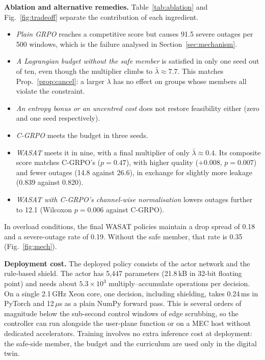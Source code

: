 \documentclass[conference]{IEEEtran}
\begin{document}
\textbf{Ablation and alternative remedies.} Table~\ref{tab:ablation} and Fig.~\ref{fig:tradeoff} separate the contribution of each ingredient.
\begin{itemize}
\item \emph{Plain GRPO} reaches a competitive score but causes 91.5 severe outages per 500 windows, which is the failure analysed in Section~\ref{sec:mechanism}.
\item \emph{A Lagrangian budget without the safe member} is satisfied in only one seed out of ten, even though the multiplier climbs to $\bar\lambda\approx7.7$. This matches Prop.~\ref{prop:cancel}: a larger $\lambda$ has no effect on groups whose members all violate the constraint.
\item \emph{An entropy bonus or an uncentred cost} does not restore feasibility either (zero and one seed respectively).
\item \emph{C-GRPO} meets the budget in three seeds.
\item \emph{WASAT} meets it in nine, with a final multiplier of only $\bar\lambda\approx0.4$. Its composite score matches C-GRPO's ($p=0.47$), with higher quality ($+0.008$, $p=0.007$) and fewer outages (14.8 against 26.6), in exchange for slightly more leakage (0.839 against 0.820).
\item \emph{WASAT with C-GRPO's channel-wise normalisation} lowers outages further to 12.1 (Wilcoxon $p=0.006$ against C-GRPO).
\end{itemize}
In overload conditions, the final WASAT policies maintain a drop spread of 0.18 and a severe-outage rate of 0.19. Without the safe member, that rate is 0.35 (Fig.~\ref{fig:mech}).

\textbf{Deployment cost.} The deployed policy consists of the actor network and the rule-based shield. The actor has 5{,}447 parameters (21.8\,kB in 32-bit floating point) and needs about $5.3\times10^{3}$ multiply--accumulate operations per decision. On a single 2.1\,GHz Xeon core, one decision, including shielding, takes 0.24\,ms in PyTorch and 12\,$\mu$s as a plain NumPy forward pass. This is several orders of magnitude below the sub-second control windows of edge scrubbing, so the controller can run alongside the user-plane function or on a MEC host without dedicated accelerators. Training involves no extra inference cost at deployment: the safe-side member, the budget and the curriculum are used only in the digital twin.
\end{document}
